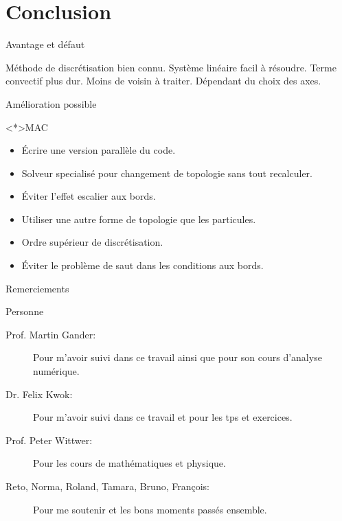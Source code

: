  \section{Conclusion}

\begin{frame}[<+->]{Avantage et défaut}
 

  \begin{itemize}
   \plusitem Méthode de discrétisation bien connu.
   \plusitem Système linéaire facil à résoudre.
   \moinsitem Terme convectif plus dur.
   \plusitem Moins de voisin à traiter.
   \moinsitem Dépendant du choix des axes.
  \end{itemize}


 
\end{frame}

\begin{frame}[<+->]{Amélioration possible}
 
 \begin{block}<*>{MAC}
  \begin{itemize}
   \item Écrire une version parallèle du code.
   \item Solveur specialisé pour changement de topologie sans tout recalculer.
   \item Éviter l'effet escalier aux bords.
   \item Utiliser une autre forme de topologie que les particules.
   \item Ordre supérieur de discrétisation.
   \item Éviter le problème de saut dans les conditions aux bords.
  \end{itemize}
  \end{block}
 
\end{frame}

\begin{frame}{Remerciements}

\begin{block}{Personne}

\begin{description}
 \item[Prof. Martin Gander:] Pour m'avoir suivi dans ce travail ainsi que pour son cours d'analyse numérique.
 \item[Dr. Felix Kwok:] Pour m'avoir suivi dans ce travail et pour les tps et exercices.
 \item[Prof. Peter Wittwer:] Pour les cours de mathématiques et physique.
 \item[Reto, Norma, Roland, Tamara, Bruno, François:] Pour me soutenir et les bons moments passés ensemble.
\end{description}
 \end{block}
 \end{frame}
 
